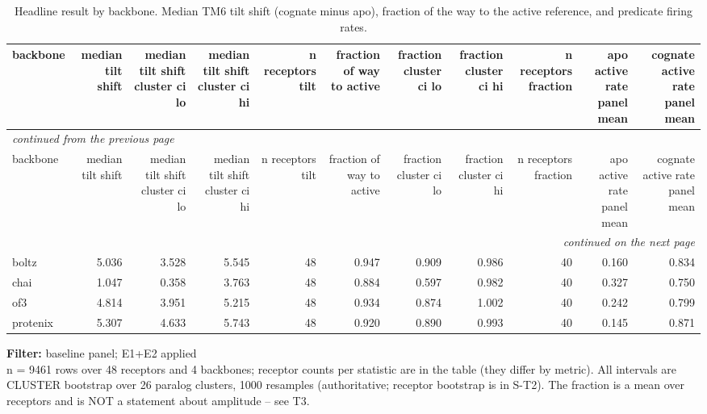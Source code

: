 \begingroup\footnotesize\setlength{\tabcolsep}{3pt}
\begin{longtable}{lrrrrrrrrrr}
\caption{Headline result by backbone. Median TM6 tilt shift (cognate minus apo), fraction of the way to the active reference, and predicate firing rates.}
\label{tab:t2_headline_by_backbone}\\
\toprule
backbone & median tilt shift & median tilt shift cluster ci lo & median tilt shift cluster ci hi & n receptors tilt & fraction of way to active & fraction cluster ci lo & fraction cluster ci hi & n receptors fraction & apo active rate panel mean & cognate active rate panel mean \\
\midrule
\endfirsthead
\multicolumn{11}{l}{\scriptsize\itshape continued from the previous page}\\
\toprule
backbone & median tilt shift & median tilt shift cluster ci lo & median tilt shift cluster ci hi & n receptors tilt & fraction of way to active & fraction cluster ci lo & fraction cluster ci hi & n receptors fraction & apo active rate panel mean & cognate active rate panel mean \\
\midrule
\endhead
\midrule
\multicolumn{11}{r}{\scriptsize\itshape continued on the next page}\\
\endfoot
\bottomrule
\endlastfoot
boltz & 5.036 & 3.528 & 5.545 & 48 & 0.947 & 0.909 & 0.986 & 40 & 0.160 & 0.834 \\
chai & 1.047 & 0.358 & 3.763 & 48 & 0.884 & 0.597 & 0.982 & 40 & 0.327 & 0.750 \\
of3 & 4.814 & 3.951 & 5.215 & 48 & 0.934 & 0.874 & 1.002 & 40 & 0.242 & 0.799 \\
protenix & 5.307 & 4.633 & 5.743 & 48 & 0.920 & 0.890 & 0.993 & 40 & 0.145 & 0.871 \\
\end{longtable}
\begin{flushleft}\scriptsize
\textbf{Filter:} baseline panel; E1+E2 applied
 \\ n = 9461 rows over 48 receptors and 4 backbones; receptor counts per statistic are in the table (they differ by metric). All intervals are CLUSTER bootstrap over 26 paralog clusters, 1000 resamples (authoritative; receptor bootstrap is in S-T2). The fraction is a mean over receptors and is NOT a statement about amplitude -- see T3.
\end{flushleft}
\endgroup
